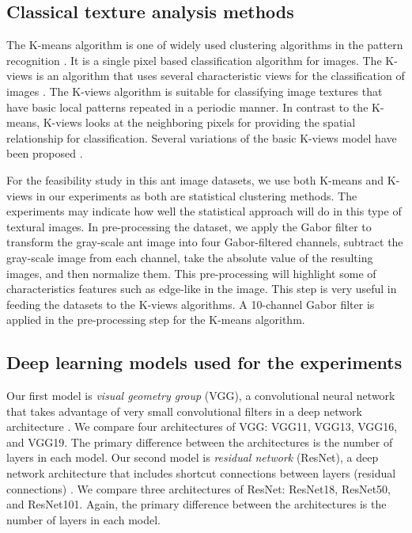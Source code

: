 \documentclass{aci}
\numberwithin{equation}{section}
\begin{document}
\subsection{Classical texture analysis methods}

The K-means algorithm is one of widely used clustering algorithms in the pattern
recognition \cite{lloyd_least_1982}. It is a single pixel based classification
algorithm for images. The K-views is an algorithm that uses several
characteristic views for the classification of images \cite{hung_use_2002}. The
K-views algorithm is suitable for classifying image textures that have basic
local patterns repeated in a periodic manner. In contrast to the K-means,
K-views looks at the neighboring pixels for providing the spatial relationship
for classification.  Several variations of the basic K-views model have been
proposed \cite{yang_image_2003, lan_improved_2010}.

For the feasibility study in this ant image datasets, we use both K-means and
K-views in our experiments as both are statistical clustering methods. The
experiments may indicate how well the statistical approach will do in this type
of textural images. In pre-processing the dataset, we apply the Gabor filter to
transform the gray-scale ant image into four Gabor-filtered channels, subtract
the gray-scale image from each channel, take the absolute value of the resulting
images, and then normalize them. This pre-processing will highlight some of
characteristics features such as edge-like in the image. This step is very
useful in feeding the datasets to the K-views algorithms. A 10-channel Gabor
filter is applied in the pre-processing step for the K-means algorithm.

\subsection{Deep learning models used for the experiments}

Our first model is \textit{visual geometry group} (VGG), a convolutional neural
network that takes advantage of very small convolutional filters in a deep
network architecture \cite{simonyan_very_2015}. We compare four architectures of
VGG: VGG11, VGG13, VGG16, and VGG19. The primary difference between the
architectures is the number of layers in each model. Our second model is
\textit{residual network} (ResNet), a deep network architecture that includes
shortcut connections between layers (residual connections) \cite{he_deep_2015}.
We compare three architectures of ResNet: ResNet18, ResNet50, and ResNet101.
Again, the primary difference between the architectures is the number of layers
in each model.
\end{document}
